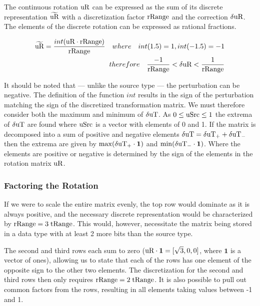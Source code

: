 The continuous rotation $\text{uR}$ can be expressed as the sum of its discrete representation $\widetilde{\text{uR}}$ with a discretization factor $\text{rRange}$ and the correction $\delta\text{uR}$. The elements of the discrete rotation can be expressed as rational fractions.

\begin{eqnarray}\label{eq:dRRange}
\widetilde{\text{uR}} = \dfrac{int(\text{uR} \cdot \text{rRange})}{\text{rRange}}\quad where\quad int(1.5) = 1, int (-1.5) = -1\\
therefore\quad \dfrac{-1}{\text{rRange}} < \delta\text{uR}  < \dfrac{1}{\text{rRange}}
\end{eqnarray}

It should be noted that --- unlike the source type \uSrc --- the perturbation can be negative. The definition of the function $int$ results in the sign of the perturbation matching the sign of the discretized transformation matrix. We must therefore consider both the maximum and minimum of $\delta\text{uT}$. As $0 \le\text{uSrc} \le 1$ the extrema of $\delta\text{uT}$ are found where $\text{uSrc}$ is a vector with elements of 0 and 1. If the matrix is decomposed into a sum of positive and negative elements $\delta\text{uT} = \delta\text{uT}_+ + \delta\text{uT}_-$ then the extrema are given by $\max(\delta\text{uT}_+ \cdot \mathbf{1})$ and $\min(\delta\text{uT}_- \cdot \mathbf{1})$. Where the elements are positive or negative is determined by the sign of the elements in the rotation matrix $\text{uR}$.

\subsubsection{Factoring the Rotation}

If we were to scale the entire matrix evenly, the top row would dominate as it is always positive, and the necessary discrete representation would be characterized by $\text{rRange} = 3 \; \text{tRange}$. This would, however, necessitate the matrix being stored in a data type with at least 2 more bits than the source type.

The second and third rows each sum to zero ($\text{uR} \cdot \mathbf{1} = [\sqrt{3},0,0]$, where $\mathbf{1}$ is a vector of ones), allowing us to state that each of the rows has one element of the opposite sign to the other two elements. The discretization for the second and third rows then only requires $\text{rRange} = 2 \; \text{tRange}$. It is also possible to pull out common factors from the rows, resulting in all elements taking values between -1 and 1.

